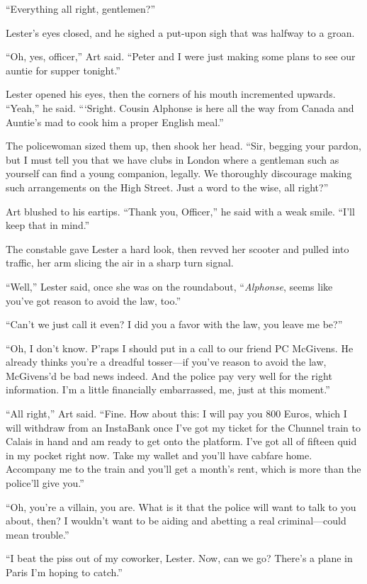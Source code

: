 “Everything all right, gentlemen?”

Lester’s eyes closed, and he sighed a put-upon sigh that was
halfway to a groan.

“Oh, yes, officer,” Art said. “Peter and I were just making some
plans to see our auntie for supper tonight.”

Lester opened his eyes, then the corners of his mouth incremented
upwards. “Yeah,” he said. “‘Sright. Cousin Alphonse is here all the
way from Canada and Auntie’s mad to cook him a proper English
meal.”

The policewoman sized them up, then shook her head. “Sir, begging
your pardon, but I must tell you that we have clubs in London where
a gentleman such as yourself can find a young companion, legally.
We thoroughly discourage making such arrangements on the High
Street. Just a word to the wise, all right?”

Art blushed to his eartips. “Thank you, Officer,” he said with a
weak smile. “I’ll keep that in mind.”

The constable gave Lester a hard look, then revved her scooter and
pulled into traffic, her arm slicing the air in a sharp turn
signal.

“Well,” Lester said, once she was on the roundabout,
“\emph{Alphonse}, seems like you’ve got reason to avoid the law,
too.”

“Can’t we just call it even? I did you a favor with the law, you
leave me be?”

“Oh, I don’t know. P’raps I should put in a call to our friend PC
McGivens. He already thinks you’re a dreadful tosser—if you’ve
reason to avoid the law, McGivens’d be bad news indeed. And the
police pay very well for the right information. I’m a little
financially embarrassed, me, just at this moment.”

“All right,” Art said. “Fine. How about this: I will pay you 800
Euros, which I will withdraw from an InstaBank once I’ve got my
ticket for the Chunnel train to Calais in hand and am ready to get
onto the platform. I’ve got all of fifteen quid in my pocket right
now. Take my wallet and you’ll have cabfare home. Accompany me to
the train and you’ll get a month’s rent, which is more than the
police’ll give you.”

“Oh, you’re a villain, you are. What is it that the police will
want to talk to you about, then? I wouldn’t want to be aiding and
abetting a real criminal—could mean trouble.”

“I beat the piss out of my coworker, Lester. Now, can we go?
There’s a plane in Paris I’m hoping to catch.”

